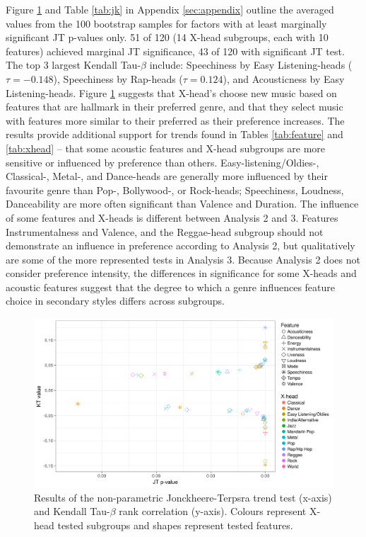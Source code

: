 \documentclass[a4paper]{article}
\begin{document}
Figure \ref{fig:jtkt} and Table \ref{tab:jk} in Appendix \ref{sec:appendix} outline the averaged values from the 100 bootstrap samples for factors with at least marginally significant JT p-values only. 51 of 120 (14 X-head subgroups, each with 10 features) achieved marginal JT significance, 43 of 120 with significant JT test. The top 3 largest Kendall Tau-$\beta$ include: Speechiness by Easy Listening-heads ($\tau = -0.148$),  Speechiness by Rap-heads ($\tau = 0.124$), and Acousticness by Easy Listening-heads. Figure \ref{fig:jtkt} suggests that X-head's choose new music based on features that are hallmark in their preferred genre, and that they select music with features more similar to their preferred as their preference increases. The results provide additional support for trends found in Tables \ref{tab:feature} and \ref{tab:xhead} -- that some acoustic features and X-head subgroups are more sensitive or influenced by preference than others. Easy-listening/Oldies-, Classical-, Metal-, and Dance-heads are generally more influenced by their favourite genre than Pop-, Bollywood-, or Rock-heads; Speechiness, Loudness, Danceability are more often significant than Valence and Duration. The influence of some features and X-heads is different between Analysis 2 and 3. Features Instrumentalness and Valence, and the Reggae-head subgroup should not demonstrate an influence in preference according to Analysis 2, but qualitatively are some of the more represented tests in Analysis 3. Because Analysis 2 does not consider preference intensity, the differences in significance for some X-heads and acoustic features suggest that the degree to which a genre influences feature choice in secondary styles differs across subgroups.

\begin{figure}[h!]
\centering
\includegraphics[width=\linewidth]{JTKTplot.png}
\caption[Jonckheere Terpstra-Kendall's Tau-$\beta$ Results]{Results of the non-parametric Jonckheere-Terpsra trend test (x-axis) and Kendall Tau-$\beta$ rank correlation (y-axis). Colours represent X-head tested subgroups and shapes represent tested features.}
\label{fig:jtkt}
\end{figure}
\end{document}
